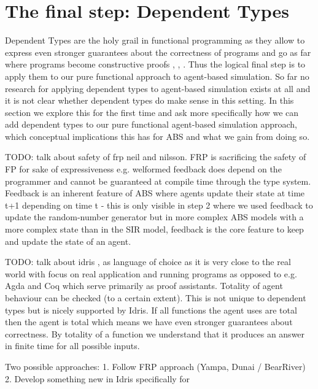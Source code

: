 \section{The final step: Dependent Types}
Dependent Types are the holy grail in functional programming as they allow to express even stronger guarantees about the correctness of programs and go as far where programs become constructive proofs \cite{altenkirch_why_2005}, \cite{altenkirch_pi_sigma:_2010}, \cite{program_homotopy_2013}. Thus the logical final step is to apply them to our pure functional approach to agent-based simulation.
So far no research for applying dependent types to agent-based simulation exists at all and it is not clear whether dependent types do make sense in this setting.
In this section we explore this for the first time and ask more specifically how we can add dependent types to our pure functional agent-based simulation approach, which conceptual implications this has for ABS and what we gain from doing so.

TODO: talk about safety of frp neil and nilsson. FRP is sacrificing the safety of FP for sake of expressiveness e.g. welformed feedback does depend on the programmer and cannot be guaranteed at compile time through the type system. Feedback is an inherent feature of ABS where agents update their state at time t+1 depending on time t - this is only visible in step 2 where we used feedback to update the random-number generator but in more complex ABS models with a more complex state than in the SIR model, feedback is the core feature to keep and update the state of an agent. 

TODO: talk about idris \cite{brady_idris_2013}, \cite{brady_type-driven_2017} as language of choice as it is very close to the real world with focus on real application and running programs as opposed to e.g. Agda and Coq which serve primarily as proof assistants.
Totality of agent behaviour can be checked (to a certain extent). This is not unique to dependent types but is nicely supported by Idris. If all functions the agent uses are total then the agent is total which means we have even stronger guarantees about correctness. By totality of a function we understand that it produces an answer in finite time for all possible inputs.

Two possible approaches:
1. Follow FRP approach (Yampa, Dunai / BearRiver) 
2. Develop something new in Idris specifically for 